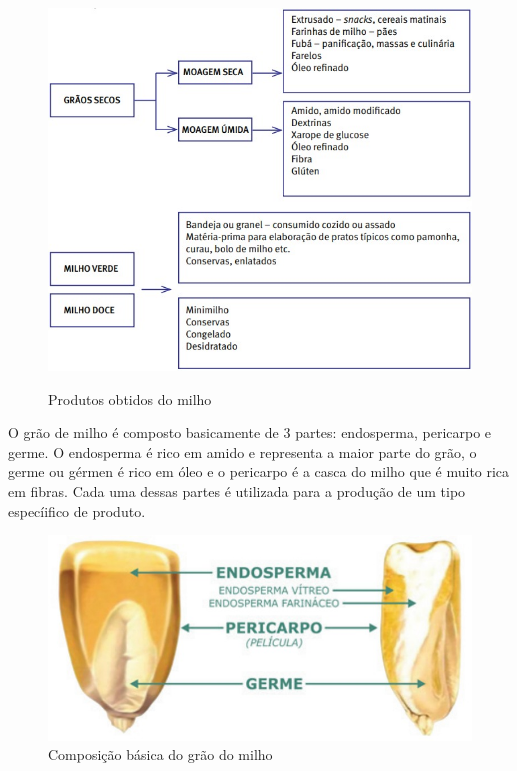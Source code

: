 \documentclass[
	12pt,				%
	openright,			%
	oneside,			%
	a4paper,			%
	english,			%
	french,				%
	spanish,			%
	brazil				%
	]{abntex2}
\begin{document}
\begin{figure}[H]
\begin{center}
\caption{Produtos obtidos do milho}
\includegraphics[scale=0.5]{Imagens/WhatsApp Image 2022-10-09 at 14.40.21.jpeg} 
\label{1}
\end{center}
\end{figure}

O grão de milho é composto basicamente de 3 partes: endosperma, pericarpo e germe. O endosperma é rico em amido e representa a maior parte do grão, o germe ou gérmen é rico em óleo e o pericarpo é a casca do milho que é muito rica em fibras. Cada uma dessas partes é utilizada para a produção de um tipo especíifico de produto. \cite{paes2006aspectos}

\begin{figure}[H]
\begin{center}
\caption{Composição básica do grão do milho}
\includegraphics[scale=0.4]{Imagens/WhatsApp Image 2022-10-09 at 14.56.22.jpeg} 
\end{center}
\end{figure}
\end{document}
